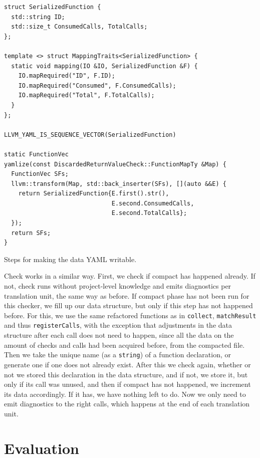 \begin{listing}[H]
  \begin{verbatim}
struct SerializedFunction {
  std::string ID;
  std::size_t ConsumedCalls, TotalCalls;
};

template <> struct MappingTraits<SerializedFunction> {
  static void mapping(IO &IO, SerializedFunction &F) {
    IO.mapRequired("ID", F.ID);
    IO.mapRequired("Consumed", F.ConsumedCalls);
    IO.mapRequired("Total", F.TotalCalls);
  }
};

LLVM_YAML_IS_SEQUENCE_VECTOR(SerializedFunction)

static FunctionVec
yamlize(const DiscardedReturnValueCheck::FunctionMapTy &Map) {
  FunctionVec SFs;
  llvm::transform(Map, std::back_inserter(SFs), [](auto &&E) {
    return SerializedFunction{E.first().str(),
                              E.second.ConsumedCalls,
                              E.second.TotalCalls};
  });
  return SFs;
}
  \end{verbatim}
  \caption{Steps for making the data YAML writable.}\label{lst:yamlize}
\end{listing}

Check works in a similar way. First, we check if compact has happened already. If not, check runs without project-level knowledge and emits diagnostics
per translation unit, the same
way as before. If compact phase has not been run for this checker, we fill up our data structure, but only if this step has not happened before.
For this, we use the same refactored functions as in \texttt{collect}, \texttt{matchResult} and thus \texttt{registerCalls}, with the exception
that adjustments in the data structure after each call does not need to happen, since all the data on the amount of checks and calls had been acquired before,
from the compacted file. Then we take the unique name (as a \texttt{string}) of a function
declaration, or generate one if one does not already exist. After this we check again, whether or not we stored this declaration in the data structure,
and if not, we store it, but only if its call was unused, and then if compact has not happened, we increment its data accordingly. If it
has, we have nothing left to do. Now we only need to emit diagnostics to the right calls, which happens at the end of each translation unit.

\section{Evaluation}
\label{sec:eval}


